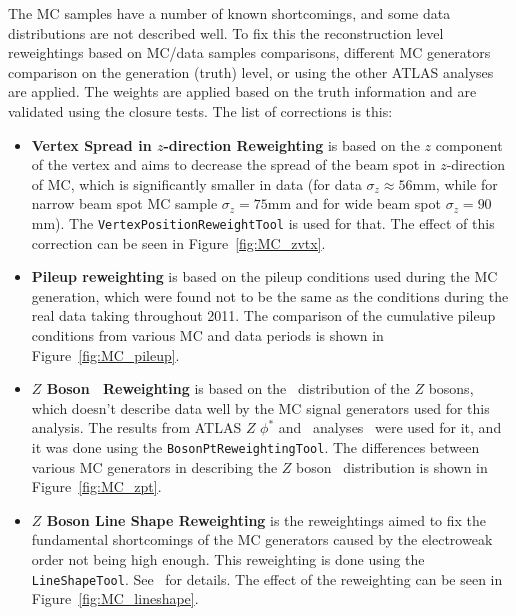 The MC samples have a number of known shortcomings, and some data distributions are not described well. To fix this the reconstruction level reweightings based on MC/data samples comparisons, different MC generators comparison on the generation (truth) level, or using the other ATLAS analyses are applied. The weights are applied based on the truth information and are validated using the closure tests. The list of corrections is this:

\begin{itemize}
\item \textbf{Vertex Spread in $z$-direction Reweighting} is based on the $z$ component of the vertex and aims to decrease the spread of the beam spot in $z$-direction of MC, which is significantly smaller in data (for data $\sigma_z \approx 56$mm, while for narrow beam spot MC sample $\sigma_z = 75$mm and for wide beam spot $\sigma_z = 90$mm). The \texttt{VertexPositionReweightTool} is used for that. The effect of this correction can be seen in Figure~\ref{fig:MC_zvtx}.
\item \textbf{Pileup reweighting} is based on the pileup conditions used during the MC generation, which were found not to be the same as the conditions during the real data taking throughout 2011. The comparison of the cumulative pileup conditions from various MC and data periods is shown in Figure~\ref{fig:MC_pileup}.
\item \textbf{$Z$ Boson \pt\ Reweighting} is based on the \pt\ distribution of the $Z$ bosons, which doesn't describe data well by the MC signal generators used for this analysis. The results from ATLAS $Z$ $\phi^*$ and \pt\ analyses~\cite{lib:Zphistar} were used for it, and it was done using the \texttt{BosonPtReweightingTool}. The differences between various MC generators in describing the $Z$ boson \pt\ distribution is shown in Figure~\ref{fig:MC_zpt}.
\item \textbf{$Z$ Boson Line Shape Reweighting} is the reweightings aimed to fix the fundamental shortcomings of the MC generators caused by the electroweak order not being high enough. This reweighting is done using the \texttt{LineShapeTool}. See~\cite{lib:lineshape} for details. The effect of the reweighting can be seen in Figure~\ref{fig:MC_lineshape}.
\end{itemize}

